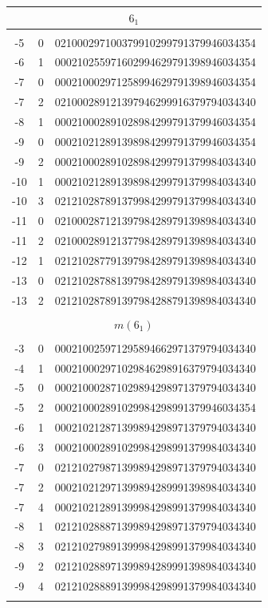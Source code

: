 \documentclass{article}
\begin{document}
\begin{supertabular}[h]{c c r}
\hline
{}                            \\
\hline\\[-3pt]
-5    & 0  & 021000297100379910299791379946034354  \\
-6    & 1  & 000210255971602994629791398946034354  \\
-7    & 0  & 000210002971258994629791398946034354  \\
-7    & 2  & 021000289121397946299916379794034340  \\
-8    & 1  & 000210002891028984299791379946034354  \\
-9    & 0  & 000210212891398984299791379946034354  \\
-9    & 2  & 000210002891028984299791379984034340  \\
-10   & 1  & 000210212891398984299791379984034340  \\
-10   & 3  & 021210287891379984299791379984034340  \\
-11   & 0  & 021000287121397984289791398984034340  \\
-11   & 2  & 021000289121377984289791398984034340  \\
-12   & 1  & 021210287791397984289791398984034340  \\
-13   & 0  & 021210287881397984289791398984034340  \\
-13   & 2  & 021210287891397984288791398984034340  \\
\\[-5pt]

\hline
{}                         \\
\hline\\[-3pt]
-3    & 0  & 000210025971295894662971379794034340  \\
-4    & 1  & 000210002971029846298916379794034340  \\
-5    & 0  & 000210002871029894298971379794034340  \\
-5    & 2  & 000210002891029984298991379946034354  \\
-6    & 1  & 000210212871399894298971379794034340  \\
-6    & 3  & 000210002891029984298991379984034340  \\
-7    & 0  & 021210279871399894298971379794034340  \\
-7    & 2  & 000210212971399894289991398984034340  \\
-7    & 4  & 000210212891399984298991379984034340  \\
-8    & 1  & 021210288871399894298971379794034340  \\
-8    & 3  & 021210279891399984298991379984034340  \\
-9    & 2  & 021210288971399894289991398984034340  \\
-9    & 4  & 021210288891399984298991379984034340  \\
\\[-5pt]


\end{supertabular}
\end{document}
